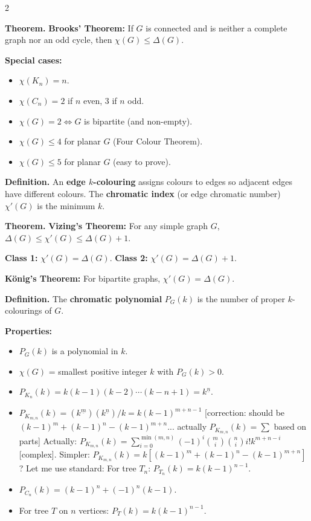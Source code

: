 \documentclass[8pt,landscape,a4paper]{extarticle}
\newcommand{\thm}[1]{\begin{mdframed}[style=theorembox]\textbf{Theorem.} #1\end{mdframed}}
\newcommand{\defn}[1]{\begin{mdframed}[style=defbox]\textbf{Definition.} #1\end{mdframed}}
\begin{document}
\begin{multicols}{2}
\thm{\textbf{Brooks' Theorem:} If $G$ is connected and is neither a complete graph nor an odd cycle, then $\chi(G) \leq \Delta(G)$.}

\textbf{Special cases:}
\begin{itemize}[nosep]
    \item $\chi(K_n) = n$.
    \item $\chi(C_n) = 2$ if $n$ even, $3$ if $n$ odd.
    \item $\chi(G) = 2 \iff G$ is bipartite (and non-empty).
    \item $\chi(G) \leq 4$ for planar $G$ (Four Colour Theorem).
    \item $\chi(G) \leq 5$ for planar $G$ (easy to prove).
\end{itemize}

\defn{An \textbf{edge $k$-colouring} assigns colours to edges so adjacent edges have different colours. The \textbf{chromatic index} (or edge chromatic number) $\chi'(G)$ is the minimum $k$.}

\thm{\textbf{Vizing's Theorem:} For any simple graph $G$, $\Delta(G) \leq \chi'(G) \leq \Delta(G) + 1$.}

\textbf{Class 1:} $\chi'(G) = \Delta(G)$. \textbf{Class 2:} $\chi'(G) = \Delta(G) + 1$.

\textbf{König's Theorem:} For bipartite graphs, $\chi'(G) = \Delta(G)$.

\defn{The \textbf{chromatic polynomial} $P_G(k)$ is the number of proper $k$-colourings of $G$.}

\textbf{Properties:}
\begin{itemize}[nosep]
    \item $P_G(k)$ is a polynomial in $k$.
    \item $\chi(G)$ = smallest positive integer $k$ with $P_G(k) > 0$.
    \item $P_{K_n}(k) = k(k-1)(k-2)\cdots(k-n+1) = k^{\underline{n}}$.
    \item $P_{K_{m,n}}(k) = (k^{\underline{m}})(k^{\underline{n}})/k = k(k-1)^{m+n-1}$ [correction: should be $(k-1)^m + (k-1)^n - (k-1)^{m+n}$... actually $P_{K_{m,n}}(k) = \sum$ based on parts] Actually: $P_{K_{m,n}}(k) = \sum_{i=0}^{\min(m,n)} (-1)^i \binom{m}{i}\binom{n}{i} i! k^{m+n-i}$ [complex]. Simpler: $P_{K_{m,n}}(k) = k[(k-1)^m + (k-1)^n - (k-1)^{m+n}]$? Let me use standard: For tree $T_n$: $P_{T_n}(k) = k(k-1)^{n-1}$.
    \item $P_{C_n}(k) = (k-1)^n + (-1)^n(k-1)$.
    \item For tree $T$ on $n$ vertices: $P_T(k) = k(k-1)^{n-1}$.
\end{itemize}


\end{multicols}
\end{document}
